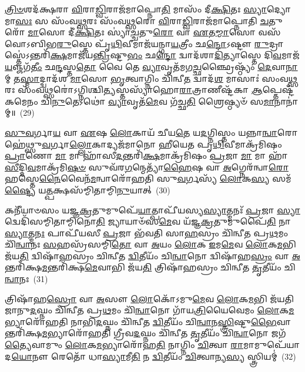 \-\ul{𑌤𑍍𑌰𑌿}\-\-\ul{𑍞}\-𑌶𑌦᳴𑌕𑍍𑌷𑌰𑌾 \ul{𑌵𑌿}\-𑌰𑌾\-\ul{𑌡𑍍𑌵𑌿}\-𑌰𑌾𑌜᳴𑌮𑌾𑌪𑍍𑌨𑍋\-\ul{𑌤𑌿} 𑌮𑌾𑌸𑌂᳴ 𑌦𑍀\-\ul{𑌕𑍍𑌷𑌿}\-𑌤𑌃 \ul{𑌸𑍍𑌯𑌾}\-𑌦𑍍𑌯𑍋 𑌮𑌾\-\ul{𑌸𑌃} 𑌸 𑌸𑌂᳴𑌵\-\ul{𑌥𑍍𑌸}\-𑌰𑌃 𑌸𑌂᳴𑌵\-\ul{𑌥𑍍𑌸}\-𑌰𑍋 \ul{𑌵𑌿}\-𑌰𑌾\-\ul{𑌡𑍍𑌵𑌿}\-𑌰𑌾𑌜᳴𑌮𑌾𑌪𑍍𑌨𑍋𑌤𑌿 \ul{𑌚}\-𑌤𑍁𑌰𑍋᳴ \ul{𑌮𑌾}\-𑌸𑍋 𑌦𑍀॑\-\ul{𑌕𑍍𑌷𑌿}\-𑌤𑌃 𑌸𑍍𑌯𑌾॑\-\ul{𑌚𑍍𑌚}\-𑌤𑍁\-\ul{𑌰𑍋} 𑌵𑌾 \ul{𑌏}\-𑌤\-\ul{𑌮𑍍𑌮𑌾}\-𑌸𑍋 𑌵𑌸᳴𑌵𑍋\-𑌽𑌬𑌿𑌭\-\ul{𑌰𑍁}\-𑌸𑍍𑌤𑍇 𑌪𑍃᳴\-\ul{𑌥𑌿}\-𑌵𑍀𑌮𑌾𑌜᳴𑌯𑌨𑍍𑌗𑌾\-\ul{𑌯}\-𑌤𑍍𑌰𑍀𑌂 𑌛\-\ul{𑌨𑍍𑌦𑍋}\-\-𑌽𑌷𑍍𑌟𑍗 \ul{𑌰𑍁}\-𑌦𑍍𑌰𑌾𑌸𑍍𑌤𑍇॑\-𑌽𑌨𑍍𑌤𑌰𑌿᳴\-\ul{𑌕𑍍𑌷}\-𑌮𑌾𑌜᳴𑌯\-\ul{𑌨𑍍𑌤𑍍𑌰𑌿}\-𑌷𑍍𑌟𑍁\-\ul{𑌭𑌂} 𑌛\-\ul{𑌨𑍍𑌦𑍋} 𑌦𑍍𑌵𑌾𑌦᳴𑌶𑌾\-\ul{𑌦𑌿}\-𑌤𑍍𑌯𑌾𑌸𑍍𑌤𑍇 𑌦𑌿\-\ul{𑌵}\-𑌮𑌾𑌜᳴\-\ul{𑌯}\-𑌞𑍍𑌜𑌗᳴\-\ul{𑌤𑍀𑌂} 𑌛\-\ul{𑌨𑍍𑌦}\-𑌸𑍍𑌤\-\ul{𑌤𑍋} 𑌵𑍈 𑌤𑍇 \ul{𑌵𑍍𑌯𑌾}\-𑌵𑍃𑌤᳴𑌮𑌗\-\ul{𑌚𑍍𑌛}\-𑌞𑍍𑌛𑍍𑌰𑍈𑌷𑍍𑌠𑍍𑌯𑌂᳴ \ul{𑌦𑍇}\-𑌵𑌾\-\ul{𑌨𑌾}\-𑌮𑍍 𑌤\-\ul{𑌸𑍍𑌮𑌾}\-𑌦𑍍𑌦𑍍𑌵𑌾𑌦᳴𑌶 \ul{𑌮𑌾}\-𑌸𑍋 \ul{𑌭𑍃}\-𑌤𑍍𑌵𑌾𑌗𑍍𑌨𑌿𑌂 𑌚𑌿᳴𑌨𑍍𑌵𑍀\-\ul{𑌤} 𑌦𑍍𑌵𑌾𑌦᳴\-\ul{𑌶} 𑌮𑌾𑌸𑌾𑌃॑ 𑌸𑌂𑌵\-\ul{𑌥𑍍𑌸}\-𑌰𑌃 𑌸𑌂᳴𑌵\-\ul{𑌥𑍍𑌸}\-𑌰𑍋॑\-𑌽𑌗𑍍𑌨𑌿𑌶𑍍𑌚𑌿\-\ul{𑌤𑍍𑌯}\-𑌸𑍍𑌤𑌸𑍍𑌯𑌾᳴𑌹𑍋\-\ul{𑌰𑌾}\-𑌤𑍍𑌰𑌾𑌣𑍀𑌷𑍍𑌟᳴𑌕𑌾 \ul{𑌆}\-𑌪𑍍𑌤𑍇𑌷𑍍𑌟᳴𑌕𑌮𑍇𑌨𑌂 𑌚𑌿\-\ul{𑌨𑍁}\-𑌤𑍇\-𑌽𑌥𑍋॑ \ul{𑌵𑍍𑌯𑌾}\-𑌵𑍃𑌤᳴\-\ul{𑌮𑍇}\-𑌵 𑌗᳴𑌚𑍍𑌛\-\ul{𑌤𑌿} 𑌶𑍍𑌰𑍈𑌷𑍍𑌠𑍍𑌯𑍞᳴ 𑌸\-\ul{𑌮𑌾}\-𑌨𑌾𑌨𑌾॑𑌮𑍍॥~(29)

{\anuvakamend[{\-\ul{𑌸𑍍𑌯𑌾}\-𑌤𑍍𑌤𑍍𑌰𑌯𑍋᳴𑌦𑌶 \ul{𑌤𑍍𑌰𑌿}\-\-\ul{𑍞}\-𑌶\-\ul{𑌤}\-\-\ul{𑍞} 𑌰𑌾𑌤𑍍𑌰𑍀॑𑌰𑍍𑌦𑍀\-\ul{𑌕𑍍𑌷𑌿}\-𑌤𑌃 \ul{𑌸𑍍𑌯𑌾}\-𑌦𑍍𑌵𑍈 𑌤𑍇॑\-𑌽𑌷𑍍𑌟𑌾𑌵𑌿𑍞᳴𑌶𑌤𑌿𑌶𑍍𑌚}]}%

\-\ul{𑌸𑍁}\-\-\ul{𑌵}\-𑌰𑍍𑌗𑌾\-\ul{𑌯} 𑌵𑌾 \ul{𑌏}\-𑌷 \ul{𑌲𑍋}\-𑌕𑌾𑌯᳴ 𑌚𑍀𑌯\-\ul{𑌤𑍇} 𑌯\-\ul{𑌦}\-𑌗𑍍𑌨𑌿𑌸𑍍𑌤𑌂 𑌯𑌨𑍍𑌨𑌾\-\ul{𑌨𑍍𑌵𑌾}\-𑌰𑍋𑌹𑍇॑𑌥𑍍𑌸𑍁\-\ul{𑌵}\-𑌰𑍍𑌗𑌾\-\ul{𑌲𑍍𑌲𑍋}\-𑌕𑌾𑌦𑍍𑌯𑌜᳴𑌮𑌾𑌨𑍋 𑌹𑍀𑌯𑍇𑌤 𑌪𑍃\-\ul{𑌥𑌿}\-𑌵𑍀𑌮𑌾𑌕𑍍𑌰᳴𑌮𑌿𑌷𑌂 \ul{𑌪𑍍𑌰𑌾}\-𑌣𑍋 \ul{𑌮𑌾} 𑌮𑌾 𑌹𑌾᳴𑌸𑍀\-\ul{𑌦}\-𑌨𑍍𑌤𑌰𑌿᳴\-\ul{𑌕𑍍𑌷}\-𑌮𑌾𑌕𑍍𑌰᳴𑌮𑌿𑌷𑌂 \ul{𑌪𑍍𑌰}\-𑌜𑌾 \ul{𑌮𑌾} 𑌮𑌾 𑌹𑌾᳴\-\ul{𑌸𑍀}\-𑌦𑍍𑌦𑌿\-\ul{𑌵}\-𑌮𑌾𑌕𑍍𑌰᳴𑌮𑌿\-\ul{𑌷}\-\-\ul{𑍞} 𑌸𑍁𑌵᳴𑌰\-\ul{𑌗}\-𑌨𑍍𑌮𑍇𑌤𑍍𑌯𑌾᳴\-\ul{𑌹𑍈}\-𑌷 𑌵𑌾 \ul{𑌅}\-𑌗𑍍𑌨𑍇𑌰᳴𑌨𑍍𑌵𑌾\-\ul{𑌰𑍋}\-𑌹𑌸𑍍𑌤𑍇\-\ul{𑌨𑍈}\-𑌵𑍈𑌨᳴\-\-\ul{𑌮}\-𑌨𑍍𑌵𑌾𑌰𑍋᳴𑌹𑌤𑌿 𑌸𑍁\-\ul{𑌵}\-𑌰𑍍𑌗𑌸𑍍𑌯᳴ \ul{𑌲𑍋}\-𑌕\-\ul{𑌸𑍍𑌯} 𑌸𑌮᳴\-\ul{𑌷𑍍𑌟𑍍𑌯𑍈} 𑌯\-\ul{𑌤𑍍𑌪}\-𑌕𑍍𑌷𑌸᳴𑌮𑍍𑌮𑌿𑌤𑌾𑌮𑍍𑌮𑌿\-\ul{𑌨𑍁}\-𑌯𑌾𑌤𑍍~(30)

𑌕𑌨𑍀᳴𑌯𑌾𑍞𑌸𑌂 𑌯𑌜𑍍𑌞\-\ul{𑌕𑍍𑌰}\-𑌤𑍁𑌮𑍁𑌪𑍇᳴\-\ul{𑌯𑌾}\-𑌤𑍍𑌪𑌾𑌪𑍀᳴𑌯𑌸𑍍𑌯\-\ul{𑌸𑍍𑌯𑌾}\-𑌤𑍍𑌮𑌨𑌃᳴ \ul{𑌪𑍍𑌰}\-𑌜𑌾 \ul{𑌸𑍍𑌯𑌾}\-𑌦𑍍𑌵𑍇𑌦𑌿᳴𑌸𑌮𑍍𑌮𑌿𑌤𑌾𑌮𑍍𑌮𑌿𑌨𑍋\-\ul{𑌤𑌿} 𑌜𑍍𑌯𑌾𑌯𑌾𑍞᳴𑌸\-\ul{𑌮𑍇}\-𑌵 𑌯᳴𑌜𑍍𑌞\-\ul{𑌕𑍍𑌰}\-𑌤𑍁𑌮𑍁𑌪𑍈᳴\-\ul{𑌤𑌿} 𑌨𑌾\-\ul{𑌸𑍍𑌯𑌾}\-𑌤𑍍𑌮\-\ul{𑌨𑌃} 𑌪𑌾𑌪𑍀᳴𑌯𑌸𑍀 \ul{𑌪𑍍𑌰}\-𑌜𑌾 𑌭᳴𑌵𑌤𑌿 𑌸𑌾\-\ul{𑌹}\-𑌸𑍍𑌰𑌂 𑌚𑌿᳴𑌨𑍍𑌵𑍀𑌤 𑌪𑍍𑌰\-\ul{𑌥}\-𑌮𑌂 𑌚𑌿᳴\-\ul{𑌨𑍍𑌵𑌾}\-𑌨𑌃 \ul{𑌸}\-𑌹𑌸𑍍𑌰᳴𑌸𑌮𑍍𑌮𑌿\-\ul{𑌤𑍋} 𑌵𑌾 \ul{𑌅}\-𑌯𑌂 \ul{𑌲𑍋}\-𑌕 \ul{𑌇}\-𑌮\-\ul{𑌮𑍇}\-𑌵 \ul{𑌲𑍋}\-𑌕\-\ul{𑌮}\-𑌭𑌿 𑌜᳴𑌯\-\ul{𑌤𑌿} 𑌦𑍍𑌵𑌿𑌷𑌾᳴𑌹𑌸𑍍𑌰𑌂 𑌚𑌿𑌨𑍍𑌵𑍀𑌤 \ul{𑌦𑍍𑌵𑌿}\-𑌤𑍀𑌯𑌂᳴ 𑌚𑌿\-\ul{𑌨𑍍𑌵𑌾}\-𑌨𑍋 𑌦𑍍𑌵𑌿𑌷𑌾᳴𑌹\-\ul{𑌸𑍍𑌰𑌂} 𑌵𑌾 \ul{𑌅}\-𑌨𑍍𑌤𑌰𑌿᳴𑌕𑍍𑌷\-\ul{𑌮}\-𑌨𑍍𑌤𑌰𑌿᳴𑌕𑍍𑌷\-\ul{𑌮𑍇}\-𑌵𑌾𑌭𑌿 𑌜᳴𑌯\-\ul{𑌤𑌿} 𑌤𑍍𑌰𑌿𑌷𑌾᳴𑌹𑌸𑍍𑌰𑌂 𑌚𑌿𑌨𑍍𑌵𑍀𑌤 \ul{𑌤𑍃}\-𑌤𑍀𑌯𑌂᳴ 𑌚𑌿\-\ul{𑌨𑍍𑌵𑌾}\-𑌨𑌃~(31)

𑌤𑍍𑌰𑌿𑌷𑌾᳴𑌹\-\ul{𑌸𑍍𑌰𑍋} 𑌵𑌾 \ul{𑌅}\-𑌸𑍗 \ul{𑌲𑍋}\-𑌕𑍋᳴\-𑌽𑌮𑍁\-\ul{𑌮𑍇}\-𑌵 \ul{𑌲𑍋}\-𑌕\-\ul{𑌮}\-𑌭𑌿 𑌜᳴𑌯𑌤𑌿 𑌜𑌾𑌨𑍁\-\ul{𑌦}\-𑌘𑍍𑌨𑌂 𑌚𑌿᳴𑌨𑍍𑌵𑍀𑌤 𑌪𑍍𑌰\-\ul{𑌥}\-𑌮𑌂 𑌚𑌿᳴\-\ul{𑌨𑍍𑌵𑌾}\-𑌨𑍋 𑌗𑌾᳴𑌯\-\ul{𑌤𑍍𑌰𑌿}\-𑌯𑍈𑌵𑍇𑌮𑌂 \ul{𑌲𑍋}\-𑌕\-\ul{𑌮}\-𑌭𑍍𑌯𑌾𑌰𑍋᳴𑌹𑌤𑌿 𑌨𑌾𑌭𑌿\-\ul{𑌦}\-𑌘𑍍𑌨𑌂 𑌚𑌿᳴𑌨𑍍𑌵𑍀𑌤 \ul{𑌦𑍍𑌵𑌿}\-𑌤𑍀𑌯𑌂᳴ 𑌚𑌿\-\ul{𑌨𑍍𑌵𑌾}\-𑌨\-\ul{𑌸𑍍𑌤𑍍𑌰𑌿}\-𑌷𑍍𑌟𑍁\-\ul{𑌭𑍈}\-𑌵𑌾𑌨𑍍𑌤𑌰𑌿᳴𑌕𑍍𑌷\-\ul{𑌮}\-𑌭𑍍𑌯𑌾𑌰𑍋᳴𑌹𑌤𑌿 𑌗𑍍𑌰𑍀𑌵\-\ul{𑌦}\-𑌘𑍍𑌨𑌂 𑌚𑌿᳴𑌨𑍍𑌵𑍀𑌤 \ul{𑌤𑍃}\-𑌤𑍀𑌯𑌂᳴ 𑌚𑌿\-\ul{𑌨𑍍𑌵𑌾}\-𑌨𑍋 𑌜𑌗᳴\-\ul{𑌤𑍍𑌯𑍈}\-𑌵𑌾𑌮𑍁𑌂 \ul{𑌲𑍋}\-𑌕\-\ul{𑌮}\-𑌭𑍍𑌯𑌾𑌰𑍋᳴𑌹\-\ul{𑌤𑌿} 𑌨𑌾𑌗𑍍𑌨𑌿𑌂 \ul{𑌚𑌿}\-𑌤𑍍𑌵𑌾 \ul{𑌰𑌾}\-𑌮𑌾𑌮𑍁𑌪𑍇᳴𑌯𑌾𑌦\-\ul{𑌯𑍋}\-𑌨𑍗 𑌰𑍇𑌤𑍋᳴ 𑌧𑌾\-\ul{𑌸𑍍𑌯𑌾}\-𑌮𑍀\-\ul{𑌤𑌿} 𑌨 \ul{𑌦𑍍𑌵𑌿}\-𑌤𑍀𑌯𑌂᳴ \ul{𑌚𑌿}\-𑌤𑍍𑌵𑌾𑌨𑍍𑌯\-\ul{𑌸𑍍𑌯} 𑌸𑍍𑌤𑍍𑌰𑌿𑌯𑌮𑍍॑~(32)

